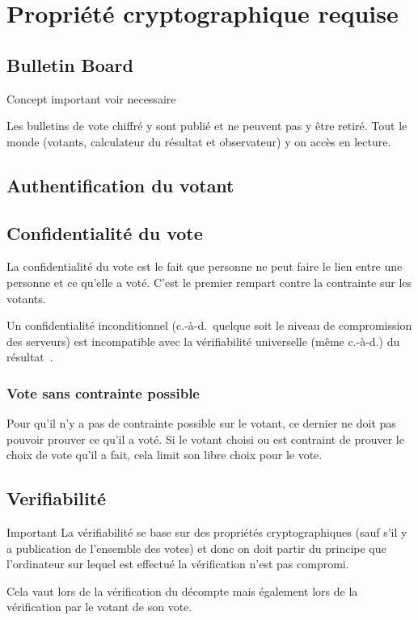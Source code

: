 \documentclass[../report]{subfiles}
\begin{document}
\chapter{Propriété cryptographique requise}
\section{Bulletin Board}
Concept important voir necessaire~\cite{gharadaghy_verifiability_2010}

Les bulletins de vote chiffré y sont publié et ne peuvent pas y être retiré.
Tout le monde (votants, calculateur du résultat et observateur) y on accès en lecture.
\section{Authentification du votant}
\section{Confidentialité du vote}
La confidentialité du vote est le fait que personne ne peut faire le lien entre une personne
et ce qu'elle a voté.
C'est le premier rempart contre la contrainte sur les votants.

Un confidentialité inconditionnel (c.-à-d.\ quelque soit le niveau de compromission des serveurs)
est incompatible avec la vérifiabilité universelle (même c.-à-d.) du 
résultat~\cite{chevallier-mames_incompatible_2010,gharadaghy_verifiability_2010}.

\subsection{Vote sans contrainte possible}

Pour qu'il n'y a pas de contrainte possible sur le votant, ce dernier ne doit pas pouvoir prouver
ce qu'il a voté. 
Si le votant choisi ou est contraint de prouver le choix de vote qu'il a fait, cela limit
son libre choix pour le vote.

\section{Verifiabilité}

\begin{important}{Important}
  La vérifiabilité se base sur des propriétés cryptographiques (sauf s'il y a publication 
  de l'ensemble des votes) et donc on doit partir du principe que l'ordinateur sur lequel 
  est effectué la vérification n'est pas compromi.

  Cela vaut lors de la vérification du décompte mais également 
  lors de la vérification par le votant de son vote.
\end{important}
\end{document}
